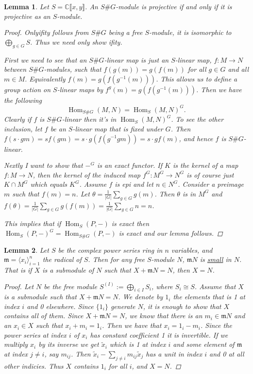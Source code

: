 \documentclass[11pt, a4paper, english]{article}
\numberwithin{prop}{section}
\newtheorem{lemma}{Lemma}
\numberwithin{lemma}{section}
\numberwithin{theorem}{section}
\numberwithin{defin}{section}
\numberwithin{example}{section}
\newcommand{\C}{\mathbb{C}}
\DeclareMathOperator{\Hom}{Hom}
\begin{document}
\begin{lemma}
\label{lem:S proj => SG proj}
Let $S = \C\llbracket x, y \rrbracket$. An $S\#G$-module is projective if and only if it is projective as an $S$-module.

\begin{proof}
Onlyifity follows from $S\#G$ being a free $S$-module, it is isomorphic to $\bigoplus_{g \in G} S$. Thus we need only show ifity.

First we need to see that an $S\#G$-linear map is just an $S$-linear map, $f: M \to N$ between $S\#G$-modules, such that $f(g(m))=g(f(m))$ for all $g \in G$ and all $m \in M$. Equivalently $f(m) = g(f(g^{-1}(m)))$. This allows us to define a group action on $S$-linear maps by $f^g(m) = g(f(g^{-1}(m)))$. Then we have the following $$ \Hom_{S\#G}(M,N) = \Hom_S(M,N)^G.$$
Clearly if $f$ is $S\#G$-linear then it's in $\Hom_S(M,N)^G$. To see the other inclusion, let $f$ be an $S$-linear map that is fixed under $G$. Then $f(s\cdot g m) = s f(g m) = s\cdot g(f(g^{-1} g m)) = s \cdot g f(m) $, and hence $f$ is $S\#G$-linear. 

Nextly I want to show that $-^G$ is an exact functor. If $K$ is the kernel of a map $f: M \to N$, then the kernel of the induced map $f^G : M^G \to N^G$ is of course just $K \cap M^G$ which equals $K^G$. Assume $f$ is epi and let $n \in N^G$. Consider a preimage $m$ such that $f(m)=n$. Let $\theta = \frac{1}{|G|}\sum_{g \in G} g(m)$. Then $\theta$ is in $M^G$ and $f(\theta) = \frac{1}{|G|}\sum_{g \in G} g(f(m)) = \frac{1}{|G|}\sum_{g \in G} n = n$.

This implies that if $\Hom_S(P, -)$ is exact then $\Hom_S(P, -)^G = \Hom_{S\#G}(P, -)$ is exact and our lemma follows.
\end{proof}
\end{lemma}

\begin{lemma}
\label{lem:radical small}
Let $S$ be the complex power series ring in $n$ variables, and $\mathfrak{m} = \langle x_i \rangle_{i=1}^n$ the radical of $S$. Then for any free $S$-module $N$, $\mathfrak{m}N$ is \underline{small} in $N$. That is if $X$ is  a submodule of $N$ such that $X + \mathfrak{m}N = N$, then $X = N$.

\begin{proof}
Let $N$ be the free module $S^{(I)} := \bigoplus\limits_{i \in I} S_i$, where $S_i \cong S$. Assume that $X$ is a submodule such that $X + \mathfrak{m}N = N$. We denote by $1_i$ the elements that is 1 at index $i$ and 0 elsewhere. Since $\{ 1_i \}$ generate $N$, it is enough to show that $X$ contains all of them. Since $X + \mathfrak{m}N = N$, we know that there is an $m_i \in \mathfrak{m}N$ and an $x_i \in X$ such that $x_i + m_i = 1_i$. Then we have that $x_i = 1_i - m_i$. Since the power series at index $i$ of $x_i$ has constant coefficient 1 it is invertible. If we multiply $x_i$ by its inverse we get $\tilde{x}_i$ which is 1 at index $i$ and some element of $\mathfrak{m}$ at index $j \neq i$, say $m_{ij}$. Then $\tilde{x}_i - \sum\limits_{j \neq i} m_{ij}\tilde{x}_j$ has a unit in index $i$ and 0 at all other indicies. Thus $X$ contains $1_i$ for all $i$, and $X = N$.
\end{proof}
\end{lemma}
\end{document}
